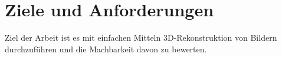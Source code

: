 
\chapter{Ziele und Anforderungen}
Ziel der Arbeit ist es mit einfachen Mitteln 3D-Rekonstruktion von Bildern durchzuführen und die Machbarkeit davon zu bewerten.
